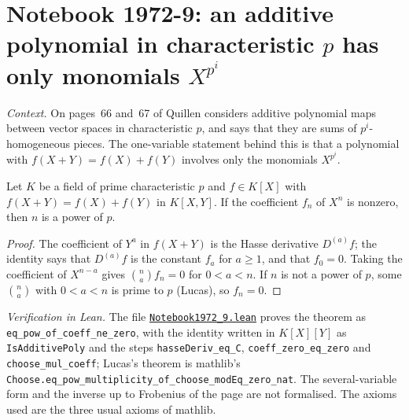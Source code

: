 \section[Notebook 1972-9: additive polynomials]{Notebook 1972-9: an additive polynomial in characteristic $p$ has only monomials $X^{p^i}$\protect{}}\label{sec:quillen-1972-9}

\emph{Context.} On pages~66 and~67 of  Quillen considers additive polynomial maps between vector spaces in characteristic $p$, and says that they are sums of $p^i$-homogeneous pieces. The one-variable statement behind this is that a polynomial with $f(X + Y) = f(X) + f(Y)$ involves only the monomials $X^{p^i}$.

\begin{encadre}
\begin{theoreme}\label{thm:quillen-1972-9}
Let $K$ be a field of prime characteristic $p$ and $f \in K[X]$ with $f(X + Y) = f(X) + f(Y)$ in $K[X, Y]$. If the coefficient $f_n$ of $X^n$ is nonzero, then $n$ is a power of $p$.
\end{theoreme}
\end{encadre}

\begin{proof}
The coefficient of $Y^a$ in $f(X + Y)$ is the Hasse derivative $D^{(a)}f$; the identity says that $D^{(a)}f$ is the constant $f_a$ for $a \ge 1$, and that $f_0 = 0$. Taking the coefficient of $X^{n-a}$ gives $\binom na f_n = 0$ for $0 < a < n$. If $n$ is not a power of $p$, some $\binom na$ with $0 < a < n$ is prime to $p$ (Lucas), so $f_n = 0$.
\end{proof}

\emph{Verification in Lean.} The file \href{\leanblobmain/Notebook1972_9.lean}{\texttt{Notebook1972\_9.\allowbreak{}lean}} proves the theorem as \texttt{eq\_pow\_of\_coeff\_ne\_zero}, with the identity written in $K[X][Y]$ as \texttt{IsAdditivePoly} and the steps \texttt{hasseDeriv\_eq\_C}, \texttt{coeff\_zero\_eq\_zero} and \texttt{choose\_mul\_coeff}; Lucas's theorem is mathlib's \texttt{Choose.eq\_pow\_multiplicity\_of\_choose\_modEq\_zero\_nat}. The several-variable form and the inverse up to Frobenius of the page are not formalised. The axioms used are the three usual axioms of mathlib.

